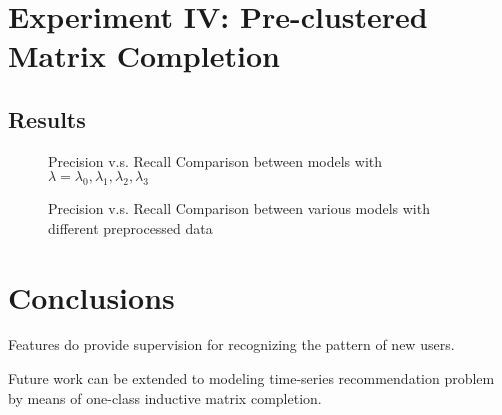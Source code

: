 \documentclass{article} %
\begin{document}
\section{Experiment IV: Pre-clustered Matrix Completion}

\subsection{Results}



\begin{figure}[h]

    \caption{Precision v.s. Recall Comparison between models with
        $\lambda=\lambda_0, \lambda_1,\lambda_2, \lambda_3$ }
\end{figure}

\begin{figure}[h]

    \caption{Precision v.s. Recall Comparison between various models with
        different preprocessed data}
\end{figure}

\section{Conclusions}
Features do provide supervision for recognizing the pattern of new users. 

Future work can be extended to modeling time-series recommendation problem by
means of one-class inductive matrix completion. 

{}

\end{document}
